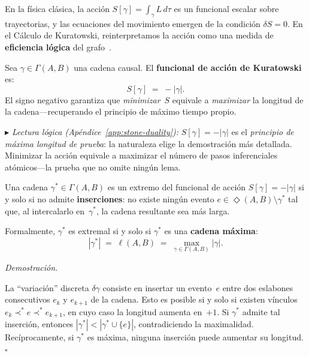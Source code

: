 \documentclass[11pt, a4paper, openany]{book}
\newcommand{\covers}{\prec^{\!*}}
\newcommand{\diam}[2]{\Diamond(#1,#2)}
\newcommand{\stoneref}[1]{%
  \smallskip\noindent
  {\small\color{structure!70}\textit{$\blacktriangleright$ Lectura
  l\'ogica (Ap\'endice~\ref{app:stone-duality}):} #1}%
  \smallskip}
\renewenvironment{proof}[1][Demostraci\'on]{%
  \par\noindent\textit{#1.}\quad
}{\hfill$\square$\par\medskip}
\begin{document}
En la f\'isica cl\'asica, la acci\'on $S[\gamma] = \int_\gamma L\,d\tau$
es un funcional escalar sobre trayectorias, y las ecuaciones del
movimiento emergen de la condici\'on $\delta S = 0$. En el C\'alculo
de Kuratowski, reinterpretamos la acci\'on como una medida de
\textbf{eficiencia l\'ogica} del
grafo~\cite{benincasa2010,benincasa2011,buck2015}.

\begin{definition}
\label{def:discrete-action}
Sea $\gamma \in \Gamma(A,B)$ una cadena causal. El \textbf{funcional
de acci\'on de Kuratowski} es:
\begin{equation}
  S[\gamma] \;=\; -|\gamma|.
  \label{eq:discrete-action}
\end{equation}
El signo negativo garantiza que \emph{minimizar}~$S$ equivale a
\emph{maximizar} la longitud de la cadena---recuperando el principio
de m\'aximo tiempo propio.
\end{definition}

\stoneref{$S[\gamma] = -|\gamma|$ es el \emph{principio de m\'axima
longitud de prueba}: la naturaleza elige la demostraci\'on m\'as
detallada. Minimizar la acci\'on equivale a maximizar el n\'umero de
pasos inferenciales at\'omicos---la prueba que no omite ning\'un
lema.}

\begin{theorem}
\label{thm:extremal-condition}
Una cadena $\gamma^* \in \Gamma(A,B)$ es un extremo del funcional de
acci\'on $S[\gamma] = -|\gamma|$ si y solo si no admite
\textbf{inserciones}: no existe ning\'un evento $e \in \diam{A}{B}
\setminus \gamma^*$ tal que, al intercalarlo en~$\gamma^*$, la cadena
resultante sea m\'as larga.

Formalmente, $\gamma^*$ es extremal si y solo si $\gamma^*$ es una
\textbf{cadena m\'axima}:
\begin{equation}
  |\gamma^*| \;=\; \ell(A,B)
  \;=\; \max_{\gamma \in \Gamma(A,B)} |\gamma|.
  \label{eq:extremal}
\end{equation}
\end{theorem}

\begin{proof}
La ``variaci\'on'' discreta $\delta\gamma$ consiste en insertar un
evento~$e$ entre dos eslabones consecutivos $e_k$ y $e_{k+1}$ de la
cadena. Esto es posible si y solo si existen v\'inculos
$e_k \covers e \covers e_{k+1}$, en cuyo caso la longitud
aumenta en~$+1$. Si $\gamma^*$ admite tal inserci\'on, entonces
$|\gamma^*| < |\gamma^* \cup \{e\}|$, contradiciendo la maximalidad.
Rec\'iprocamente, si $\gamma^*$ es m\'axima, ninguna inserci\'on puede
aumentar su longitud.
\end{proof}
\end{document}
